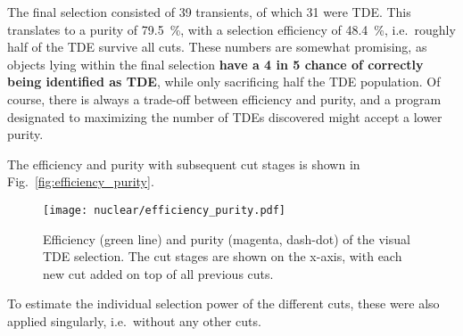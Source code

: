 The final selection consisted of 39 transients, of which 31 were TDE. This translates to a purity of \SI{79.5}{\percent}, with a selection efficiency of \SI{48.4}{\percent}, i.e.~roughly half of the TDE survive all cuts. These numbers are somewhat promising, as objects lying within the final selection \textbf{have a 4 in 5 chance of correctly being identified as TDE}, while only sacrificing half the TDE population. Of course, there is always a trade-off between efficiency and purity, and a program designated to maximizing the number of TDEs discovered might accept a lower purity.

The efficiency and purity with subsequent cut stages is shown in Fig.~\ref{fig:efficiency_purity}.

\begin{figure}[htpb]
    \texttt{[image: nuclear/efficiency\_purity.pdf]}
    \caption[Visual TDE selection]{Efficiency (green line) and purity (magenta, dash-dot) of the visual TDE selection. The cut stages are shown on the x-axis, with each new cut added on top of all previous cuts.}
\end{figure}
To estimate the individual selection power of the different cuts, these were also applied singularly, i.e.~without any other cuts.


